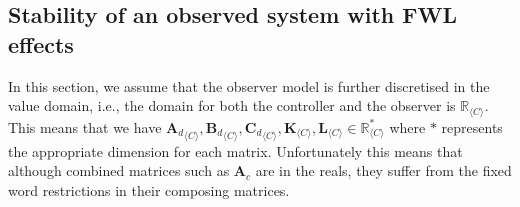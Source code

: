 \documentclass[sigconf]{llncs}
\newcommand{\mat}[1]{\boldsymbol{#1}}
\begin{document}
\subsection{Stability of an observed system with FWL effects}\label{sec:cof_fwl_stability}


In this section, we assume that the observer model is further discretised in
the value domain, i.e., the domain for both
the controller and the observer is $\mathbb{R}_{\langle C \rangle}$.
%
This means that we have 
${\mat{A}_d}_{\langle C
\rangle},{\mat{B}_d}_{\langle C \rangle},{\mat{C}_d}_{\langle C \rangle},
\mat{K}_{\langle C \rangle}, \mat{L}_{\langle C \rangle} \in
\mathbb{R}_{\langle C \rangle}^*$ where $*$ represents the appropriate
dimension for each matrix.  Unfortunately this means that although combined
matrices such as $\mat{A}_c$ are in the reals, they suffer from the fixed
word restrictions in their composing matrices.
\end{document}
